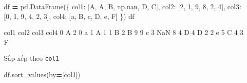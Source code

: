 \documentclass[
]{book}
\newenvironment{Shaded}{\begin{snugshade}}{\end{snugshade}}
\newcommand{\DecValTok}[1]{\textcolor[rgb]{0.00,0.00,0.81}{#1}}
\newcommand{\NormalTok}[1]{#1}
\newcommand{\OperatorTok}[1]{\textcolor[rgb]{0.81,0.36,0.00}{\textbf{#1}}}
\newcommand{\StringTok}[1]{\textcolor[rgb]{0.31,0.60,0.02}{#1}}
\begin{document}
\begin{Shaded}
\begin{Highlighting}[]
\NormalTok{df }\OperatorTok{=}\NormalTok{ pd.DataFrame(\{}
    \StringTok{\textquotesingle{}col1\textquotesingle{}}\NormalTok{: [}\StringTok{\textquotesingle{}A\textquotesingle{}}\NormalTok{, }\StringTok{\textquotesingle{}A\textquotesingle{}}\NormalTok{, }\StringTok{\textquotesingle{}B\textquotesingle{}}\NormalTok{, np.nan, }\StringTok{\textquotesingle{}D\textquotesingle{}}\NormalTok{, }\StringTok{\textquotesingle{}C\textquotesingle{}}\NormalTok{],}
    \StringTok{\textquotesingle{}col2\textquotesingle{}}\NormalTok{: [}\DecValTok{2}\NormalTok{, }\DecValTok{1}\NormalTok{, }\DecValTok{9}\NormalTok{, }\DecValTok{8}\NormalTok{, }\DecValTok{2}\NormalTok{, }\DecValTok{4}\NormalTok{],}
    \StringTok{\textquotesingle{}col3\textquotesingle{}}\NormalTok{: [}\DecValTok{0}\NormalTok{, }\DecValTok{1}\NormalTok{, }\DecValTok{9}\NormalTok{, }\DecValTok{4}\NormalTok{, }\DecValTok{2}\NormalTok{, }\DecValTok{3}\NormalTok{],}
    \StringTok{\textquotesingle{}col4\textquotesingle{}}\NormalTok{: [}\StringTok{\textquotesingle{}a\textquotesingle{}}\NormalTok{, }\StringTok{\textquotesingle{}B\textquotesingle{}}\NormalTok{, }\StringTok{\textquotesingle{}c\textquotesingle{}}\NormalTok{, }\StringTok{\textquotesingle{}D\textquotesingle{}}\NormalTok{, }\StringTok{\textquotesingle{}e\textquotesingle{}}\NormalTok{, }\StringTok{\textquotesingle{}F\textquotesingle{}}\NormalTok{]}
\NormalTok{\})}
\NormalTok{df}
\end{Highlighting}
\end{Shaded}

\begin{Shaded}
\begin{Highlighting}[]
\NormalTok{  col1  col2  col3 col4}
\NormalTok{0    A     2     0    a}
\NormalTok{1    A     1     1    B}
\NormalTok{2    B     9     9    c}
\NormalTok{3  NaN     8     4    D}
\NormalTok{4    D     2     2    e}
\NormalTok{5    C     4     3    F}
\end{Highlighting}
\end{Shaded}

Sắp xếp theo \texttt{col1}

\begin{Shaded}
\begin{Highlighting}[]
\NormalTok{df.sort\_values(by}\OperatorTok{=}\NormalTok{[}\StringTok{\textquotesingle{}col1\textquotesingle{}}\NormalTok{])}
\end{Highlighting}
\end{Shaded}
\end{document}
